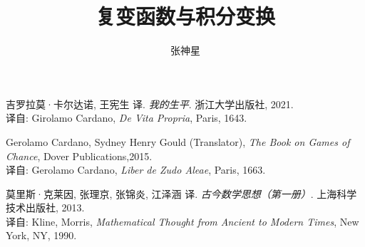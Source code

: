 \documentclass[11pt,a4paper,twoside,openright,scheme=chinese]{ctexbook}
\title{复变函数与积分变换}
\author{张神星}
\institute{合肥工业大学}
\date{\zhtoday}
\begin{document}











\mainmatter


% 
% 
% 
% 
% 


% 





\begin{thebibliography}{Car43}

吉罗拉莫·卡尔达诺, 王宪生 译.
{\em 我的生平}.
浙江大学出版社, 2021.\\
译自: 
Girolamo Cardano, {\em De Vita Propria}, Paris, 1643.

Gerolamo Cardano, Sydney Henry Gould (Translator),
{\em The Book on Games of Chance}, Dover Publications,2015.\\
译自: 
Gerolamo Cardano, {\em Liber de Zudo Aleae}, Paris, 1663.


莫里斯·克莱因, 张理京, 张锦炎, 江泽涵 译.
{\em 古今数学思想（第一册）}.
上海科学技术出版社, 2013.\\
译自: 
Kline, Morris, {\em Mathematical Thought from Ancient to Modern Times}, New York, NY, 1990.


\end{thebibliography}
\end{document}
